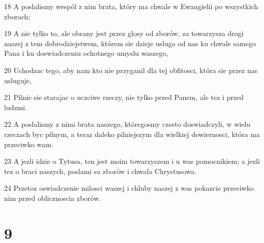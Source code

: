 \par 18 A poslalismy wespól z nim brata, który ma chwale w Ewangielii po wszystkich zborach;
\par 19 A nie tylko to, ale obrany jest przez glosy od zborów, za towarzysza drogi naszej z tem dobrodziejstwem, którem sie dzieje usluga od nas ku chwale samego Pana i ku doswiadczeniu ochotnego umyslu waszego,
\par 20 Uchodzac tego, aby nam kto nie przyganil dla tej obfitosci, która sie przez nas usluguje,
\par 21 Pilnie sie starajac o uczciwe rzeczy, nie tylko przed Panem, ale tez i przed ludzmi.
\par 22 A poslalismy z nimi brata naszego, któregosmy czesto doswiadczyli, w wielu rzeczach byc pilnym, a teraz daleko pilniejszym dla wielkiej dowiernosci, która ma przeciwko wam.
\par 23 A jezli idzie o Tytusa, ten jest moim towarzyszem i u was pomocnikiem; a jezli tez o braci naszych, poslami sa zborów i chwala Chrystusowa.
\par 24 Przetoz oswiadczenie milosci waszej i chluby naszej z was pokazcie przeciwko nim przed oblicznoscia zborów.

\chapter{9}

